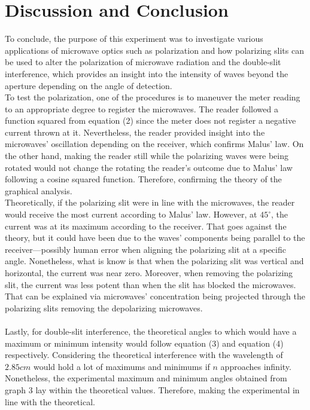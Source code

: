\documentclass[11pt]{article}
\begin{document}
\section*{Discussion and Conclusion}
To conclude, the purpose of this experiment was to investigate various applications of microwave optics such as polarization and how polarizing slits can be used to alter the polarization of microwave radiation and the double-slit interference, which provides an insight into the intensity of waves beyond the aperture depending on the angle of detection. \\
To test the polarization, one of the procedures is to maneuver the meter reading to an appropriate degree to register the microwaves. The reader followed a function squared from equation (2) since the meter does not register a negative current thrown at it. Nevertheless, the reader provided insight into the microwaves' oscillation depending on the receiver, which confirms Malus' law. On the other hand, making the reader still while the polarizing waves were being rotated would not change the rotating the reader's outcome due to Malus' law following a cosine squared function. Therefore, confirming the theory of the graphical analysis.\\ 
Theoretically, if the polarizing slit were in line with the microwaves, the reader would receive the most current according to Malus' law. However, at $45^\circ$, the current was at its maximum according to the receiver. That goes against the theory, but it could have been due to the waves' components being parallel to the receiver—possibly human error when aligning the polarizing slit at a specific angle. Nonetheless, what is know is that when the polarizing slit was vertical and horizontal, the current was near zero. Moreover, when removing the polarizing slit, the current was less potent than when the slit has blocked the microwaves. That can be explained via microwaves' concentration being projected through the polarizing slits removing the depolarizing microwaves. \\

\\Lastly, for double-slit interference, the theoretical angles to which would have a maximum or minimum intensity would follow equation (3) and equation (4) respectively. Considering the theoretical interference with the wavelength of $2.85cm$ would hold a lot of maximums and minimums if $n$ approaches infinity. Nonetheless, the experimental maximum and minimum angles obtained from graph 3 lay within the theoretical values. Therefore, making the experimental in line with the theoretical. 
\end{document}
